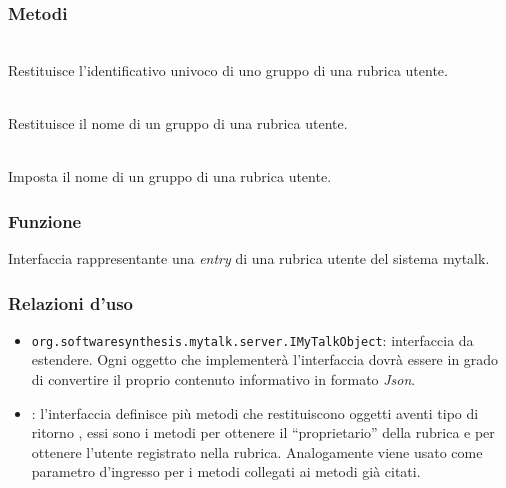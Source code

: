 \subsubsection*{Metodi}
\begin{description}
	\item{}\\
	Restituisce l'identificativo univoco di uno gruppo di una rubrica utente.
	\item{}\\
	Restituisce il nome di un gruppo di una rubrica utente.
	\item{}\\
	Imposta il nome di un gruppo di una rubrica utente.
\end{description}


\subsubsection*{Funzione}
Interfaccia rappresentante una \textit{entry} di una rubrica utente del sistema mytalk.

\subsubsection*{Relazioni d'uso}
\begin{itemize}
	\item \texttt{org.softwaresynthesis.mytalk.server.IMyTalkObject}: interfaccia da estendere. Ogni oggetto che implementerà l'interfaccia  dovrà essere in grado di convertire il proprio contenuto informativo in formato \textit{Json}.
	\item {}: l'interfaccia  definisce più metodi che restituiscono oggetti aventi tipo di ritorno , essi sono i metodi  per ottenere il ``proprietario'' della rubrica e per ottenere l'utente registrato nella rubrica. Analogamente  viene usato come parametro d'ingresso per i metodi  collegati ai metodi già citati.
\end{itemize}

